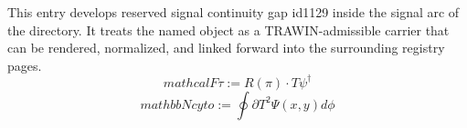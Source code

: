 
\begin{tzpsnapshot}
\end{tzpsnapshot}

This entry develops reserved signal continuity gap id1129 inside the signal arc of the directory. It treats the named object as a TRAWIN-admissible carrier that can be rendered, normalized, and linked forward into the surrounding registry pages.
\[
mathcal{F} {\tau}:=R(\pi)\cdot T {\psi}^{\dagger}
\]
\[
mathbb{N} {cyto}:=\oint {\partial T^{2}}\Psi(x,y)d\phi
\]


